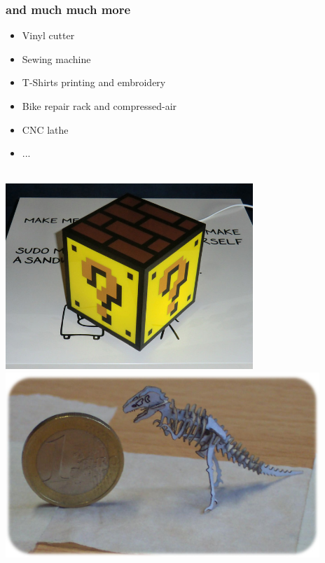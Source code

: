 \documentclass[t]{beamer}
\begin{document}
\begin{frame}
    \frametitle{and much much more}
    \begin{itemize}
        \item Vinyl cutter
        \item Sewing machine
        \item T-Shirts printing and embroidery
        \item Bike repair rack and compressed-air
        \item CNC lathe
        \item ...
    \end{itemize}
    \begin{center}
        ~\\

        \includegraphics[height=7cm]{../img/mariolampe.jpg}
        \hspace{1em}
        \includegraphics[height=7cm]{../img/tinysaur.jpg}
    \end{center}
\end{frame}
\end{document}
